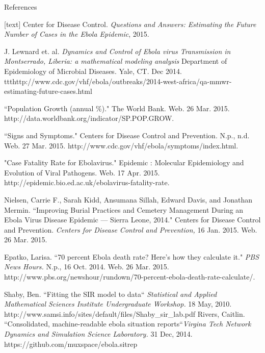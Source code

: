 \documentclass{beamer}
\begin{document}
\begin{frame}{References}

\begin{thebibliography}{3}
[text]
\tiny
{} Center for Disease Control. \emph{Questions and Answers: Estimating the Future Number of Cases in the Ebola Epidemic}, 2015. 

J. Lewnard et. al. \emph{Dynamics and Control of Ebola virus Transmission in Montserrado, Liberia: a mathematical modeling analysis} Department of Epidemiology of Microbial Diseases. Yale, 
CT. Dec 2014. ttt{http://www.cdc.gov/vhf/ebola/outbreaks/2014-west-africa/qa-mmwr-estimating-future-cases.html}

 ``Population Growth (annual \%)." The World Bank. Web. 26 Mar. 2015. http://data.worldbank.org/indicator/SP.POP.GROW. 

 ``Signs and Symptoms." Centers for Disease Control and Prevention. N.p., n.d. Web. 27 Mar. 2015. http://www.cdc.gov/vhf/ebola/symptoms/index.html. 

 "Case Fatality Rate for Ebolavirus." Epidemic : Molecular Epidemiology and Evolution of Viral Pathogens. Web. 17 Apr. 2015. http://epidemic.bio.ed.ac.uk/ebolavirus-fatality-rate. 

Nielsen, Carrie F., Sarah Kidd, Ansumana Sillah, Edward Davis, and Jonathan Mermin. ``Improving Burial Practices and Cemetery Management During an Ebola Virus Disease Epidemic — Sierra Leone, 2014." Centers for Disease Control and Prevention. \emph{Centers for Disease Control and Prevention,} 16 Jan. 2015. Web. 26 Mar. 2015.

 Epatko, Larisa. ``70 percent Ebola death rate? Here’s how they calculate it." \emph{PBS News Hours.} N.p., 16 Oct. 2014. Web. 26 Mar. 2015. http://www.pbs.org/newshour/rundown/70-percent-ebola-death-rate-calculate/. 

 Shaby, Ben. ``Fitting the SIR model to data`` \emph{Statistical and Applied Mathematical Sciences Institute Undergraduate Workshop.} 18 May, 2010.   http://www.samsi.info/sites/default/files/Shaby\_sir\_lab.pdf  
 Rivers, Caitlin.  ``Consolidated, machine-readable ebola situation reports``\emph{Virgina Tech Network Dynamics and Simulation Science Laboratory.} 31 Dec, 2014. https://github.com/muxspace/ebola.sitrep 



\end{thebibliography}	

\end{frame}
\end{document}
